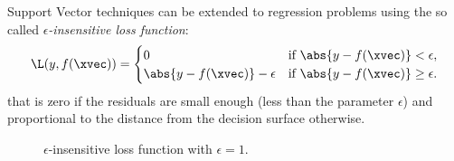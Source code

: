 Support Vector techniques can be extended to regression problems using the so called \emph{\mbox{$\epsilon$-insensitive} loss function}:
\begin{equation}
    \L(y, f(\xvec)) = \begin{cases}
        0                             & \text{if } \abs{y - f(\xvec)} < \epsilon,    \\
        \abs{y - f(\xvec)} - \epsilon & \text{if } \abs{y - f(\xvec)} \geq \epsilon.
    \end{cases}
\end{equation}
that is zero if the residuals are small enough (less than the parameter $\epsilon$) and proportional to the distance from the decision surface otherwise.

\begin{figure}
    \centering
    \caption{$\epsilon$-insensitive loss function with $\epsilon = 1$.}
\end{figure}